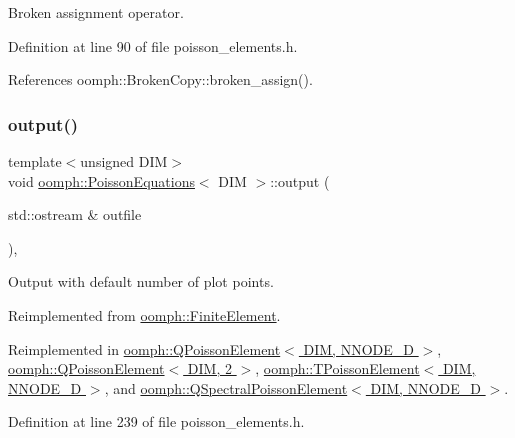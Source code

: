 Broken assignment operator. 



Definition at line 90 of file poisson\+\_\+elements.\+h.



References oomph\+::\+Broken\+Copy\+::broken\+\_\+assign().

\mbox{\label{classoomph_1_1PoissonEquations_a2417afb77d428846d7a1eada342ea8bb}} 
\subsubsection{\texorpdfstring{output()}{output()}\hspace{0.1cm}{\footnotesize\ttfamily [1/4]}}
{\footnotesize\ttfamily template$<$unsigned D\+IM$>$ \\
void \hyperlink{classoomph_1_1PoissonEquations}{oomph\+::\+Poisson\+Equations}$<$ D\+IM $>$\+::output (\begin{DoxyParamCaption}\item[{std\+::ostream \&}]{outfile }\end{DoxyParamCaption})\hspace{0.3cm}{\ttfamily [inline]}, {\ttfamily [virtual]}}



Output with default number of plot points. 



Reimplemented from \hyperlink{classoomph_1_1FiniteElement_a2ad98a3d2ef4999f1bef62c0ff13f2a7}{oomph\+::\+Finite\+Element}.



Reimplemented in \hyperlink{classoomph_1_1QPoissonElement_a8ca8f7f4c9e4ba9f5558391a8e22d170}{oomph\+::\+Q\+Poisson\+Element$<$ D\+I\+M, N\+N\+O\+D\+E\+\_\+D $>$}, \hyperlink{classoomph_1_1QPoissonElement_a8ca8f7f4c9e4ba9f5558391a8e22d170}{oomph\+::\+Q\+Poisson\+Element$<$ D\+I\+M, 2 $>$}, \hyperlink{classoomph_1_1TPoissonElement_a44da26efce008c0c7c986f9277cd3302}{oomph\+::\+T\+Poisson\+Element$<$ D\+I\+M, N\+N\+O\+D\+E\+\_\+D $>$}, and \hyperlink{classoomph_1_1QSpectralPoissonElement_aa102e31f1f3c1f3040d69842aa0ad75a}{oomph\+::\+Q\+Spectral\+Poisson\+Element$<$ D\+I\+M, N\+N\+O\+D\+E\+\_\+D $>$}.



Definition at line 239 of file poisson\+\_\+elements.\+h.



